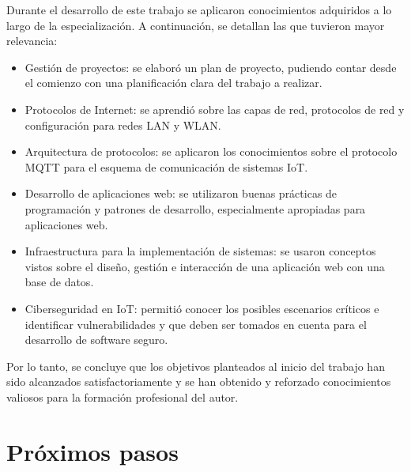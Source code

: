 
Durante el desarrollo de este trabajo se aplicaron conocimientos adquiridos a lo largo de la especialización. A continuación, se detallan las que tuvieron mayor relevancia:


\begin{itemize}
\item Gestión de proyectos: se elaboró un plan de proyecto, pudiendo contar desde el comienzo con una planificación clara del trabajo a realizar.

\item Protocolos de Internet: se aprendió sobre las capas de red, protocolos de red y configuración para redes LAN y WLAN. 

\item Arquitectura de protocolos: se aplicaron los conocimientos sobre el protocolo MQTT para el esquema de comunicación de sistemas IoT.

\item Desarrollo de aplicaciones web: se utilizaron buenas prácticas de programación y patrones de desarrollo, especialmente apropiadas para aplicaciones web. 

\item Infraestructura para la implementación de sistemas: se usaron conceptos vistos sobre el diseño, gestión e interacción de una aplicación web con una base de datos.

\item Ciberseguridad en IoT: permitió conocer los posibles escenarios críticos e identificar vulnerabilidades y que deben ser tomados en cuenta para el desarrollo de software seguro.

\end{itemize}

Por lo tanto, se concluye que los objetivos planteados al inicio del trabajo han sido alcanzados satisfactoriamente y se han obtenido y reforzado conocimientos valiosos para la formación profesional del autor.


\section{Próximos pasos}


